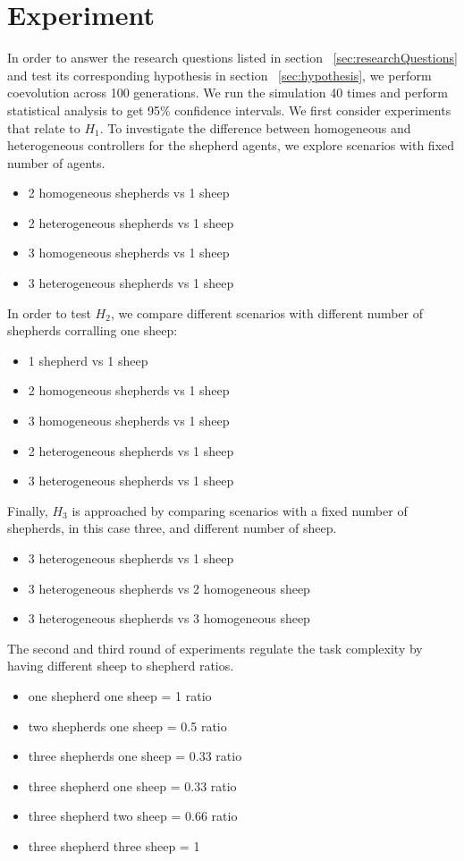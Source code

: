 \documentclass[conference]{IEEEtran}
\begin{document}
\section{Experiment}
\label{sec:experiment}
In order to answer the research questions listed in section ~\ref{sec:researchQuestions} and test its corresponding hypothesis in section ~\ref{sec:hypothesis}, we perform coevolution across 100 generations. We run the simulation 40 times and perform statistical analysis to get 95\% confidence intervals.
We first consider experiments that relate to $H_1$. To investigate the difference between homogeneous and heterogeneous controllers for the shepherd agents, we explore scenarios with fixed number of agents. 
\begin{itemize}
	\item 2 homogeneous shepherds vs 1 sheep
	\item 2 heterogeneous shepherds vs 1 sheep
	\item 3 homogeneous shepherds vs 1 sheep
	\item 3 heterogeneous shepherds vs 1 sheep
\end{itemize}
In order to test $H_2$, we compare different scenarios with different number of shepherds corralling one sheep:
\begin{itemize}
	\item 1 shepherd vs 1 sheep	
	\item 2 homogeneous shepherds vs 1 sheep
	\item 3 homogeneous shepherds vs 1 sheep
	\item 2 heterogeneous shepherds vs 1 sheep
	\item 3 heterogeneous shepherds vs 1 sheep
	
\end{itemize}
Finally, $H_3$ is approached by comparing scenarios with a fixed number of shepherds, in this case three, and different number of sheep. 
\begin{itemize}
	\item 3 heterogeneous shepherds vs 1 sheep
	\item 3 heterogeneous shepherds vs 2 homogeneous sheep
	\item 3 heterogeneous shepherds vs 3 homogeneous sheep
\end{itemize}
The second and third round of experiments regulate the task complexity by having different sheep to shepherd ratios. 
\begin{itemize}
	\item one shepherd one sheep = 1 ratio
	\item two shepherds one sheep = 0.5 ratio
	\item three shepherds one sheep = 0.33 ratio
	
	\item three shepherd one sheep = 0.33 ratio
	\item three shepherd two sheep = 0.66 ratio
	\item three shepherd three sheep = 1
\end{itemize}
\end{document}
